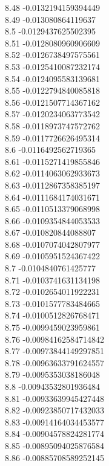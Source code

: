 {8.48	-0.0132194159394449\\
8.49	-0.013080864119637\\
8.5	-0.0129437625502395\\
8.51	-0.0128080960906609\\
8.52	-0.0126738497575561\\
8.53	-0.0125410087232174\\
8.54	-0.0124095583139681\\
8.55	-0.0122794840085818\\
8.56	-0.0121507714367162\\
8.57	-0.0120234063773542\\
8.58	-0.0118973747572762\\
8.59	-0.0117726626495314\\
8.6	-0.0116492562719365\\
8.61	-0.0115271419855846\\
8.62	-0.0114063062933673\\
8.63	-0.0112867358385197\\
8.64	-0.0111684174031671\\
8.65	-0.0110513379068998\\
8.66	-0.0109354844053533\\
8.67	-0.010820844088807\\
8.68	-0.0107074042807977\\
8.69	-0.0105951524367422\\
8.7	-0.0104840761425777\\
8.71	-0.0103741631134198\\
8.72	-0.0102654011922231\\
8.73	-0.0101577783484665\\
8.74	-0.0100512826768471\\
8.75	-0.0099459023959861\\
8.76	-0.00984162584714842\\
8.77	-0.00973844149297851\\
8.78	-0.00963633791624557\\
8.79	-0.0095353038186048\\
8.8	-0.00943532801936484\\
8.81	-0.00933639945427448\\
8.82	-0.00923850717432033\\
8.83	-0.00914164034453577\\
8.84	-0.00904578824281774\\
8.85	-0.00895094025876584\\
8.86	-0.00885708589252145\\
}
